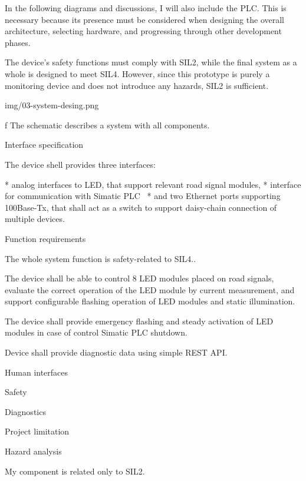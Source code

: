 In the following diagrams and discussions, I will also include the PLC. This is necessary because its presence must be considered when designing the overall architecture, selecting hardware, and progressing through other development phases.  

The device's safety functions must comply with SIL2, while the final system as a whole is designed to meet SIL4. However, since this prototype is purely a monitoring device and does not introduce any hazards, SIL2 is sufficient.

\medskip
{}
\picw=12cm \cinspic img/03-system-desing.png
\caption/f The schematic describes a system with all components.
\medskip

\secc Interface specification

The device shell provides three interfaces:

\begitems
* {\sbf analog interfaces} to LED, that support relevant road signal modules,
* interface for {\sbf communication with Simatic PLC}~
* and {\sbf two Ethernet ports} supporting 100Base-Tx, that shall act as a switch to support daisy-chain connection of multiple devices.
\enditems

\secc Function requirements

The whole system function is safety-related to SIL4..

The device shall be able to control 8 LED modules placed on road signals, evaluate the correct operation of the LED module by current measurement, and support configurable flashing operation of LED modules and static illumination.

The device shall provide emergency flashing and steady activation of LED modules in case of control Simatic PLC shutdown.

Device shall provide diagnostic data using simple REST API.

\secc Human interfaces

\secc Safety

\secc Diagnostics

\secc Project limitation

\sec Hazard analysis


My component is related only to SIL2.